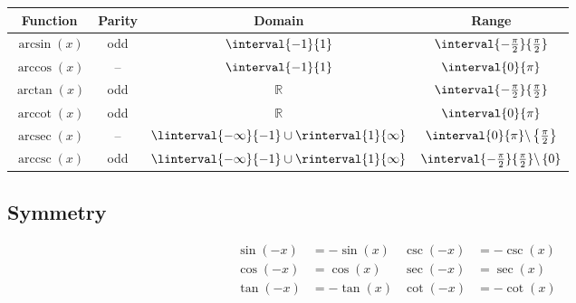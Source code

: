 \documentclass{article}
\DeclareMathOperator{\arccot}{arccot}
\DeclareMathOperator{\arcsec}{arcsec}
\DeclareMathOperator{\arccsc}{arccsc}
\begin{document}
\begin{table}[H]
    \centering
    \begin{tabular}{c|c|cc}
        \toprule
        \textbf{Function}             & \textbf{Parity} & \textbf{Domain}                                        & \textbf{Range}                                                             \\
        \midrule
        \(\arcsin{\left( x \right)}\) & odd             & \(\interval{-1}{1}\)                                   & \(\interval{-\frac{\pi}{2}}{\frac{\pi}{2}}\)                               \\
        \(\arccos{\left( x \right)}\) & --              & \(\interval{-1}{1}\)                                   & \(\interval{0}{\pi}\)                                                      \\
        \(\arctan{\left( x \right)}\) & odd             & \(\mathbb{R}\)                                         & \(\interval{-\frac{\pi}{2}}{\frac{\pi}{2}}\)                               \\
        \(\arccot{\left( x \right)}\) & odd             & \(\mathbb{R}\)                                         & \(\interval{0}{\pi}\)                                                      \\
        \(\arcsec{\left( x \right)}\) & --              & \(\linterval{-\infty}{-1} \cup \rinterval{1}{\infty}\) & \(\interval{0}{\pi} \backslash \left\{ \frac{\pi}{2} \right\}\)            \\
        \(\arccsc{\left( x \right)}\) & odd             & \(\linterval{-\infty}{-1} \cup \rinterval{1}{\infty}\) & \(\interval{-\frac{\pi}{2}}{\frac{\pi}{2}} \backslash \left\{ 0 \right\}\) \\
        \bottomrule
    \end{tabular}
\end{table}
\subsection{Symmetry}
\begin{align*}
    \sin{\left( -x \right)} & = -\sin{\left( x \right)} & \csc{\left( -x \right)} & = -\csc{\left( x \right)} \\
    \cos{\left( -x \right)} & =  \cos{\left( x \right)} & \sec{\left( -x \right)} & =  \sec{\left( x \right)} \\
    \tan{\left( -x \right)} & = -\tan{\left( x \right)} & \cot{\left( -x \right)} & = -\cot{\left( x \right)}
\end{align*}
\end{document}
